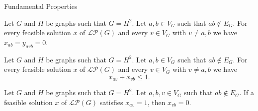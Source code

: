 \documentclass[10pt]{beamer}
\begin{document}
\begin{frame}{Fundamental Properties}
    \small

    \begin{lemma} \label{lemma::g_ab=0}
        Let $G$ and $H$ be graphs such that $G = H^2$. Let $a,b \in V_G$ such that $ab \notin E_G$. For every feasible solution $x$ of $\mathcal{LP}(G)$ and every $v \in V_G$ with $v \neq a,b$ we have $x_{ab} = y_{avb} = 0$.
    \end{lemma}

    \begin{lemma} \label{lemma::g_ab=0,two_edge_sum}
        Let $G$ and $H$ be graphs such that $G = H^2$. Let $a,b \in V_G$ such that $ab \notin E_G$. For every feasible solution $x$ of $\mathcal{LP}(G)$ and every $v \in V_G$ with $v \neq a,b$ we have
        \[
        x_{av} + x_{vb} \leq 1.
        \]
    \end{lemma}

    \begin{lemma} \label{lemma::g_ab=0,x_av=1}
        Let $G$ and $H$ be graphs such that $G = H^2$. Let $a,b,v \in V_G$ such that $ab \notin E_G$. If a feasible solution $x$ of $\mathcal{LP}(G)$ satisfies $x_{av}=1$, then $x_{vb}=0$.
    \end{lemma}

    \vspace{0.3em}
    \centering
\end{frame}
\end{document}
